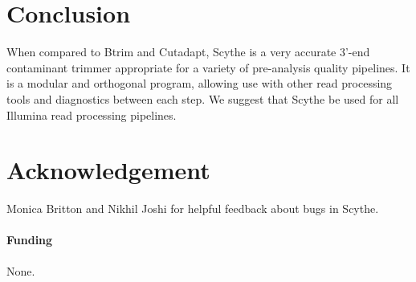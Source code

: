 \documentclass{bioinfo}
\begin{document}
\section{Conclusion}

When compared to Btrim and Cutadapt, Scythe is a very accurate 3'-end
contaminant trimmer appropriate for a variety of pre-analysis quality
pipelines. It is a modular and orthogonal program, allowing use with
other read processing tools and diagnostics between each step. We
suggest that Scythe be used for all Illumina read processing
pipelines.


\section*{Acknowledgement}
Monica Britton and Nikhil Joshi for helpful feedback about bugs in
Scythe. 

\paragraph{Funding\textcolon} None.



% 
% 
% 
% 


\end{document}

